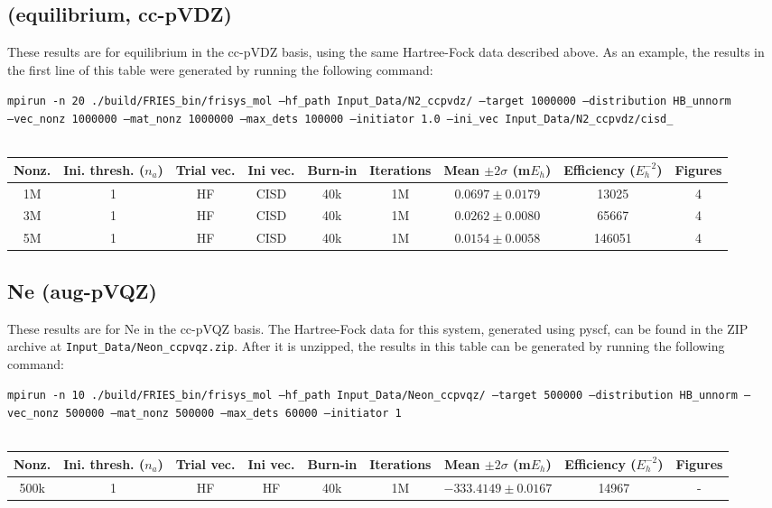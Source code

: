 \documentclass[12pt, landscape]{article}
\begin{document}
\subsection*{ (equilibrium, cc-pVDZ)}
These results are for equilibrium  in the cc-pVDZ basis, using the same Hartree-Fock data described above. As an example, the results in the first line of this table were generated by running the following command:

\texttt{mpirun -n 20 ./build/FRIES\_bin/frisys\_mol --hf\_path Input\_Data/N2\_ccpvdz/ --target 1000000 --distribution HB\_unnorm}\\ \texttt{--vec\_nonz 1000000 --mat\_nonz 1000000 --max\_dets 100000 --initiator 1.0 --ini\_vec Input\_Data/N2\_ccpvdz/cisd\_}
\\~\\
\begin{tabular}{c|c|c|c|c|c|c|c|c}
Nonz. & Ini. thresh. ($n_a$) & Trial vec. & Ini vec. & Burn-in & Iterations & Mean $\pm 2 \sigma$ (m$E_h$) & Efficiency ($E_h^{-2}$) & Figures \\ \hline
1M & 1 & HF & CISD & 40k & 1M & $0.0697 \pm 0.0179$ & 13025 & 4\\
3M & 1 & HF & CISD & 40k & 1M & $0.0262 \pm 0.0080$ & 65667 & 4\\
5M & 1 & HF & CISD & 40k & 1M & $0.0154 \pm 0.0058$ & 146051 & 4\\
\end{tabular}

\subsection*{Ne (aug-pVQZ)}
These results are for Ne in the cc-pVQZ basis. The Hartree-Fock data for this system, generated using pyscf, can be found in the ZIP archive at \texttt{Input\_Data/Neon\_ccpvqz.zip}. After it is unzipped, the results in this table can be generated by running the following command:

\texttt{mpirun -n 10 ./build/FRIES\_bin/frisys\_mol --hf\_path Input\_Data/Neon\_ccpvqz/ --target 500000 --distribution HB\_unnorm --vec\_nonz 500000 --mat\_nonz 500000 --max\_dets 60000 --initiator 1}
\\~\\
\begin{tabular}{c|c|c|c|c|c|c|c|c}
Nonz. & Ini. thresh. ($n_a$) & Trial vec. & Ini vec. & Burn-in & Iterations & Mean $\pm 2 \sigma$ (m$E_h$) & Efficiency ($E_h^{-2}$) & Figures \\ \hline
500k & 1 & HF & HF & 40k & 1M & $-333.4149 \pm 0.0167$ & 14967 & - \\
\end{tabular}
\end{document}
